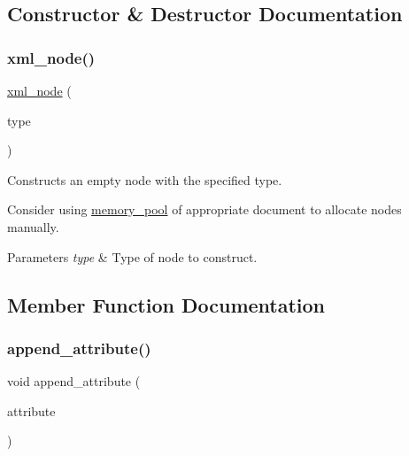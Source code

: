 \subsection{Constructor \& Destructor Documentation}
\mbox{\label{classrapidxml_1_1xml__node_a34c55af3504549a475e5b9dfcaa6adf5}} 
\subsubsection{\texorpdfstring{xml\+\_\+node()}{xml\_node()}}
{\footnotesize\ttfamily \mbox{\hyperlink{classrapidxml_1_1xml__node}{xml\+\_\+node}} (\begin{DoxyParamCaption}\item[{\mbox{\hyperlink{namespacerapidxml_a6a276b85e2da28c5f9c3dbce61c55682}{node\+\_\+type}}}]{type }\end{DoxyParamCaption})\hspace{0.3cm}{\ttfamily [inline]}}



Constructs an empty node with the specified type. 

Consider using \mbox{\hyperlink{classrapidxml_1_1memory__pool}{memory\+\_\+pool}} of appropriate document to allocate nodes manually. 
\begin{DoxyParams}{Parameters}
{\em type} & Type of node to construct. \\
\hline
\end{DoxyParams}


\subsection{Member Function Documentation}
\mbox{\label{classrapidxml_1_1xml__node_a8fbd4f5ef7169d493da9f8d87ac04b77}} 
\subsubsection{\texorpdfstring{append\+\_\+attribute()}{append\_attribute()}}
{\footnotesize\ttfamily void append\+\_\+attribute (\begin{DoxyParamCaption}\item[{\mbox{\hyperlink{classrapidxml_1_1xml__attribute}{xml\+\_\+attribute}}$<$ Ch $>$ $\ast$}]{attribute }\end{DoxyParamCaption})\hspace{0.3cm}{\ttfamily [inline]}}



